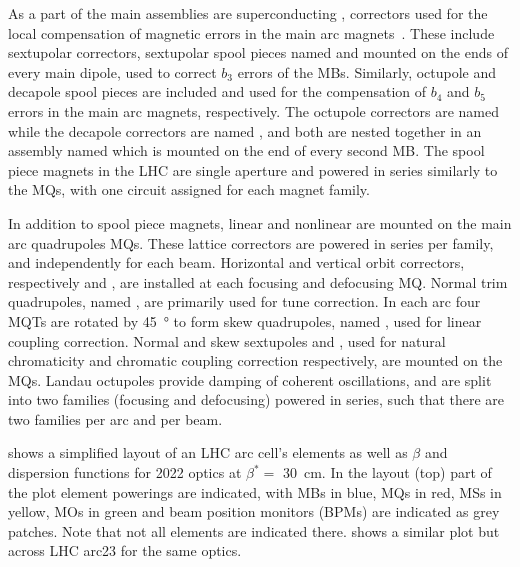 As a part of the main assemblies are superconducting , correctors used for the local compensation of magnetic errors in the main arc magnets~\cite{BOOK:Bruning:LHC_Design_Report_Main_Ring}.
These include sextupolar correctors, sextupolar spool pieces named  and mounted on the ends of every main dipole, used to correct \(b_3\) errors of the MBs.
Similarly, octupole and decapole spool pieces are included and used for the compensation of \(b_4\) and \(b_5\) errors in the main arc magnets, respectively.
The octupole correctors are named  while the decapole correctors are named , and both are nested together in an assembly named  which is mounted on the end of every second MB.
The spool piece magnets in the LHC are single aperture and powered in series similarly to the MQs, with one circuit assigned for each magnet family.

In addition to spool piece magnets, linear and nonlinear  are mounted on the main arc quadrupoles MQs.
These lattice correctors are powered in series per family, and independently for each beam.
Horizontal and vertical orbit correctors, respectively  and , are installed at each focusing and defocusing MQ.
Normal trim quadrupoles, named , are primarily used for tune correction.
In each arc four MQTs are rotated by \qty{45}{\degree} to form skew quadrupoles, named , used for linear coupling correction.
Normal and skew sextupoles  and , used for natural chromaticity and chromatic coupling correction respectively, are mounted on the MQs.
Landau octupoles  provide damping of coherent oscillations, and are split into two families (focusing and defocusing) powered in series, such that there are two families per arc and per beam.

 shows a simplified layout of an LHC arc cell's elements as well as \(\beta\) and dispersion functions for \num{2022} optics at \(\beta^{\ast} =\) \qty{30}{\centi\meter}.
In the layout (top) part of the plot element powerings are indicated, with MBs in \textcolor{latwiss_blue}{blue}, MQs in \textcolor{latwiss_red}{red}, MSs in \textcolor{latwiss_yellow}{yellow}, MOs in \textcolor{latwiss_green}{green} and beam position monitors (BPMs) are indicated as grey patches.
Note that not all elements are indicated there.
 shows a similar plot but across LHC arc\num{23} for the same optics.

